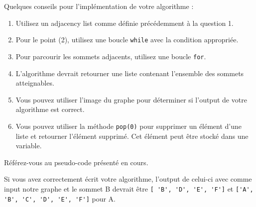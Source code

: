 \begin{Exercice}[20 minutes]  [Python]
    \begin{conseil}
        Quelques conseils pour l'implémentation de votre algorithme :
        \begin{enumerate}
            \item Utilisez un adjacency list comme définie précédemment à la question 1.
            \item Pour le point (2), utilisez une boucle \lstinline{while} avec la condition appropriée.
            \item Pour parcourir les sommets adjacents, utilisez une boucle \lstinline{for}.
            \item L'algorithme devrait retourner une liste contenant l'ensemble des sommets atteignables.
            \item Vous pouvez utiliser l'image du graphe pour déterminer si l'output de votre algorithme est correct.
            \item Vous pouvez utiliser la méthode \lstinline{pop(0)} pour supprimer un élément d'une liste et retourner l'élément supprimé. Cet élément peut être stocké dans une variable.
        \end{enumerate}
        Référez-vous au pseudo-code présenté en cours.
    \end{conseil}
    \begin{solution}
        
        Si vous avez correctement écrit votre algorithme, l'output de celui-ci avec comme input notre graphe et le sommet B devrait être \lstinline|[ 'B', 'D', 'E', 'F']| et \lstinline|['A', 'B', 'C', 'D', 'E', 'F']| pour A.
    \end{solution}
\end{Exercice}


